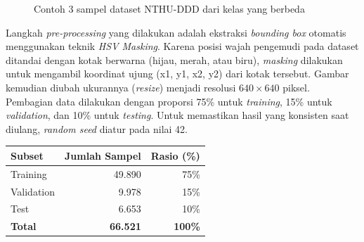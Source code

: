 \documentclass[11pt,a4paper,oneside]{report}
\begin{document}
\begin{sloppypar}
\begin{figure}[!ht]
\caption{Contoh 3 sampel dataset NTHU-DDD dari kelas yang berbeda}
\label{fig:contoh-dataset}

\end{figure}

Langkah \textit{pre-processing} yang dilakukan adalah ekstraksi \textit{bounding box} otomatis menggunakan teknik \textit{HSV Masking}. Karena posisi wajah pengemudi pada dataset ditandai dengan kotak berwarna (hijau, merah, atau biru), \textit{masking} dilakukan untuk mengambil koordinat ujung (x1, y1, x2, y2) dari kotak tersebut. Gambar kemudian diubah ukurannya (\textit{resize}) menjadi resolusi $640 \times 640$ piksel. Pembagian data dilakukan dengan proporsi 75\% untuk \textit{training}, 15\% untuk \textit{validation}, dan 10\% untuk \textit{testing}. Untuk memastikan hasil yang konsisten saat diulang, \textit{random seed} diatur pada nilai 42.

\end{sloppypar} %


\begin{center}
\label{tab:split-data}
\begin{tabular}{lrr}
\toprule
\textbf{Subset} & \textbf{Jumlah Sampel} & \textbf{Rasio (\%)} \\
\midrule
Training   & 49.890 & 75\% \\
Validation & 9.978 & 15\% \\
Test       & 6.653 & 10\% \\
\midrule
\textbf{Total} & \textbf{66.521} & \textbf{100\%} \\
\bottomrule
\end{tabular}
\end{center} %
\end{document}
